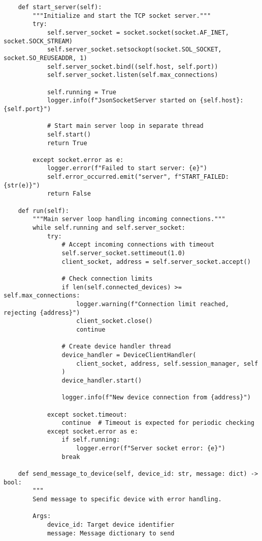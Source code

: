 \documentclass[11pt,a4paper]{article}
\begin{document}
\begin{verbatim}
    def start_server(self):
        """Initialize and start the TCP socket server."""
        try:
            self.server_socket = socket.socket(socket.AF_INET, socket.SOCK_STREAM)
            self.server_socket.setsockopt(socket.SOL_SOCKET, socket.SO_REUSEADDR, 1)
            self.server_socket.bind((self.host, self.port))
            self.server_socket.listen(self.max_connections)

            self.running = True
            logger.info(f"JsonSocketServer started on {self.host}:{self.port}")

            # Start main server loop in separate thread
            self.start()
            return True

        except socket.error as e:
            logger.error(f"Failed to start server: {e}")
            self.error_occurred.emit("server", f"START_FAILED: {str(e)}")
            return False

    def run(self):
        """Main server loop handling incoming connections."""
        while self.running and self.server_socket:
            try:
                # Accept incoming connections with timeout
                self.server_socket.settimeout(1.0)
                client_socket, address = self.server_socket.accept()

                # Check connection limits
                if len(self.connected_devices) >= self.max_connections:
                    logger.warning(f"Connection limit reached, rejecting {address}")
                    client_socket.close()
                    continue

                # Create device handler thread
                device_handler = DeviceClientHandler(
                    client_socket, address, self.session_manager, self
                )
                device_handler.start()

                logger.info(f"New device connection from {address}")

            except socket.timeout:
                continue  # Timeout is expected for periodic checking
            except socket.error as e:
                if self.running:
                    logger.error(f"Server socket error: {e}")
                break

    def send_message_to_device(self, device_id: str, message: dict) -> bool:
        """
        Send message to specific device with error handling.

        Args:
            device_id: Target device identifier
            message: Message dictionary to send


\end{verbatim}
\end{document}
